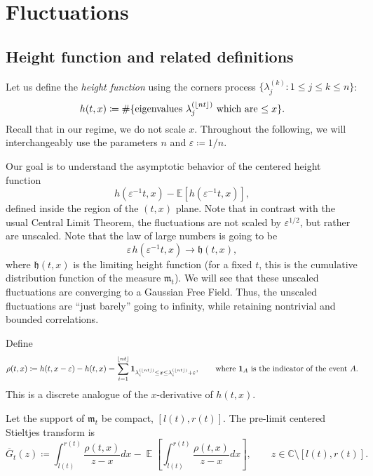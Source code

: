 \documentclass[letterpaper,11pt,oneside,reqno]{article}
\numberwithin{equation}{section}
\newcommand{\ssp}{\hspace{1pt}}
\theoremstyle{definition}
\begin{document}
\section{Fluctuations}

\subsection{Height function and related definitions}

Let us define the \emph{height function} using the corners process
$\{ \lambda^{(k)}_j\colon 1\le j\le k\le n \}$:
\begin{equation*}
	h(t,x)\coloneqq \#
	\{ \textnormal{eigenvalues $\lambda^{(\lfloor nt \rfloor )}_j$ which
	are $\leq x$} \}.
\end{equation*}
Recall that in our regime, we do not scale $x$.
Throughout the following, we will interchangeably use
the parameters $n$ and
$\varepsilon\coloneqq 1/n$.

Our goal is to understand the asymptotic behavior of the centered height function
$$
h(\varepsilon^{-1}t, x) - \mathbb{E}[h(\varepsilon^{-1}t, x)]
,
$$
defined inside the region of the $(t,x)$ plane.
Note that in contrast with the usual Central Limit Theorem,
the fluctuations are not scaled by $\varepsilon^{1/2}$,
but rather are unscaled.
Note that the law of large numbers is going to be
\begin{equation*}
	\varepsilon
	\ssp h(\varepsilon^{-1}t, x) \to
	\mathfrak{h}(t,x),
\end{equation*}
where $\mathfrak{h}(t,x)$ is the limiting height function
(for a fixed $t$, this is the cumulative distribution function
of the measure $\mathfrak{m}_t$).
We will see that these unscaled fluctuations are
converging to a Gaussian Free Field. Thus,
the unscaled fluctuations
are ``just barely'' going to infinity,
while retaining nontrivial and bounded correlations.

Define
\begin{equation}
	\label{eq:rho_definition}
	\rho(t,x) \coloneqq h(t,x-\varepsilon)-h(t,x)= \sum_{i=1}^{\lfloor nt \rfloor }
	\mathbf{1}_{\lambda_i^{(\lfloor nt \rfloor )}\le x\le \lambda_{i}^{(\lfloor nt \rfloor )}+\varepsilon},\qquad \textnormal{where $\mathbf{1}_A$ is the indicator of the event $A$.}
\end{equation}
This is a discrete analogue of the $x$-derivative of $h(t,x)$.

Let the support of $\mathfrak{m}_t$ be compact, $[l(t),r(t)]$.
The pre-limit centered Stieltjes transform is
\begin{equation*}
	\overline G_t(z)\coloneqq \int_{l(t)}^{r(t)}\frac{\rho(t,x)}{z-x}dx-
	\operatorname{\mathbb{E}}\left[
	\int_{l(t)}^{r(t)}\frac{\rho(t,x)}{z-x}dx
	\right],\qquad z\in \mathbb{C}\setminus [l(t),r(t)].
\end{equation*}
\end{document}
